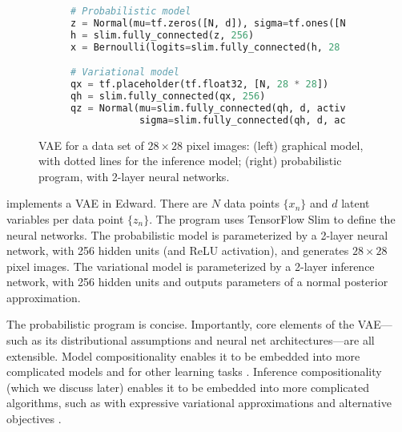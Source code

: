 \begin{figure}[tb]
\begin{subfigure}{0.225\columnwidth}
  \centering
  
  \label{sub:vae_math}
\end{subfigure}%
\begin{subfigure}{0.65\columnwidth}
  \centering
\begin{lstlisting}[language=python]
# Probabilistic model
z = Normal(mu=tf.zeros([N, d]), sigma=tf.ones([N, d]))
h = slim.fully_connected(z, 256)
x = Bernoulli(logits=slim.fully_connected(h, 28 * 28, activation_fn=None))

# Variational model
qx = tf.placeholder(tf.float32, [N, 28 * 28])
qh = slim.fully_connected(qx, 256)
qz = Normal(mu=slim.fully_connected(qh, d, activation_fn=None),
            sigma=slim.fully_connected(qh, d, activation_fn=tf.nn.softplus))
\end{lstlisting}
  \label{sub:vae_code}
\end{subfigure}
\caption{\Acrlong{VAE} for a data set of $28\times 28$ pixel images:
(left) graphical model, with dotted lines for the inference
model; (right) probabilistic program,
with 2-layer neural networks.
}
\label{fig:vae}
\end{figure}

implements
a \gls{VAE} \citep{kingma2014autoencoding,rezende2014stochastic} in Edward.
There are $N$ data points $\{x_n\}$ and $d$ latent
variables per data point $\{z_n\}$.
The program uses TensorFlow Slim \citep{guadarrama2016tensorflow}
to define the neural networks.
The probabilistic model is parameterized by a 2-layer neural network,
with 256 hidden units (and ReLU activation), and generates $28\times 28$
pixel images.  The variational model is parameterized by
a 2-layer inference network, with 256 hidden units and outputs
parameters of a normal posterior approximation.

The probabilistic program is concise.  Importantly, core elements of
the \gls{VAE}---such as its distributional assumptions and neural net
architectures---are all extensible.
Model compositionality enables it to be embedded into more complicated
models \citep{gregor2015draw,rezende2016one} and for other learning
tasks \citep{kingma2014semi}.
Inference compositionality (which we discuss later) enables it to be embedded into more
complicated algorithms, such as with expressive variational
approximations \citep{rezende2015variational,tran2016variational,kingma2016improving}
and alternative objectives \citep{ranganath2016operator,li2016variational,dieng2016chi}.


